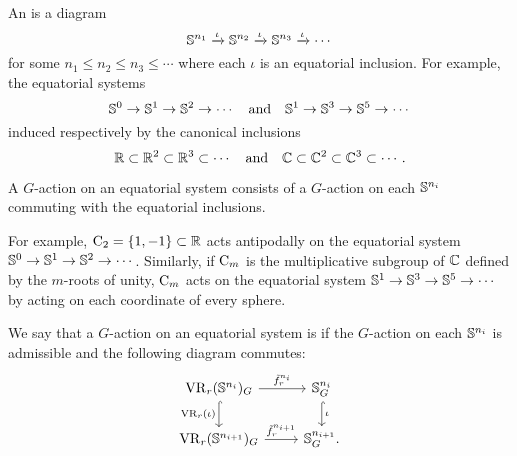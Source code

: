 

\subsubsection{}

An  is a diagram
\[
\mathbb{S}^{n_1} \xrightarrow{\iota} \mathbb{S}^{n_2} \xrightarrow{\iota} \mathbb{S}^{n_3} \xrightarrow{\iota} \dotsb
\]
for some \(n_1 \leq n_2 \leq n_3 \leq \dotsb\) where each \(\iota\) is an equatorial inclusion.
For example, the equatorial systems
\[
\mathbb{S}^0 \to \mathbb{S}^1 \to \mathbb{S}^2 \to \dotsb
\quad\text{and}\quad
\mathbb{S}^1 \to \mathbb{S}^3 \to \mathbb{S}^5 \to \dotsb
\]
induced respectively by the canonical inclusions
\[
\mathbb{R} \subset \mathbb{R}^2 \subset \mathbb{R}^3 \subset \dotsb
\quad\text{and}\quad
\mathbb{C} \subset \mathbb{C}^2 \subset \mathbb{C}^3 \subset \dotsb.
\]

A \(G\)-action on an equatorial system consists of a \(G\)-action on each \(\mathbb{S}^{n_i}\) commuting with the equatorial inclusions.

For example, \(\mathrm{C}_2 = \{1,-1\} \subset \mathbb{R}\) acts antipodally on the equatorial system \(\mathbb{S}^0 \to \mathbb{S}^1 \to \mathbb{S}^2 \to \dotsb\).
Similarly, if \(\mathrm{C}_m\) is the multiplicative subgroup of \(\mathbb{C}\) defined by the \(m\)-roots of unity, \(\mathrm{C}_m\) acts on the equatorial system \(\mathbb{S}^1 \to \mathbb{S}^3 \to \mathbb{S}^5 \to \dotsb\) by acting on each coordinate of every sphere.

We say that a \(G\)-action on an equatorial system is  if the \(G\)-action on each \(\mathbb{S}^{n_i}\) is admissible and the following diagram commutes:
\[
\begin{tikzcd}
	\VR_r(\bS^{n_i})_G
	\ar[d, hook, "{\VR_r(\iota)}" left]
	\ar[r, "\tilde f_r^{{n_i}}" above]
	&
	\bS^{n_i}_G
	\ar[d, hook, "\iota"]
	\\
	\VR_r(\bS^{n_{i+1}})_G
	\ar[r, "\tilde f_r^{n_{i+1}}" above]
	&
	\bS^{n_{i+1}}_G.
\end{tikzcd}
\]


